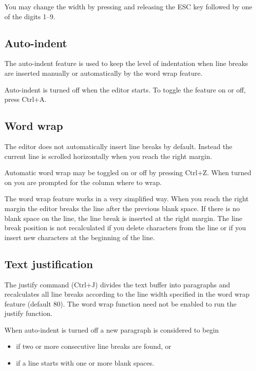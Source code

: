 \documentclass{article}
\begin{document}
        You may change the width by pressing and releasing the ESC key followed
        by one of the digits 1--9.
                
    \subsection{Auto-indent}
        The auto-indent feature is used to keep the level of indentation when line breaks are inserted manually or automatically by
        the word wrap feature.

        Auto-indent is turned off when the editor starts. To toggle the feature on or off, press Ctrl+A.

    \subsection{Word wrap}
        The editor does not automatically insert line breaks by default. Instead the current line is scrolled horizontally
        when you reach the right margin.

        Automatic word wrap may be toggled on or off by pressing Ctrl+Z. When turned on you are prompted for the column
        where to wrap.

        The word wrap feature works in a very simplified way. When you reach the right margin the editor breaks the
        line after the previous blank space. If there is no blank space on the line, the line break is inserted
        at the right margin. The line break position is not recalculated if you delete characters from the line
        or if you insert new characters at the beginning of the line.

    \subsection{Text justification}
        The justify command (Ctrl+J) divides the text buffer into paragraphs and recalculates all line breaks
        according to the line width specified in the word wrap feature (default 80). The word wrap function 
        need not be enabled to run the justify function.
          
        When auto-indent is turned off a new paragraph is considered to begin

        \begin{itemize}
            \item if two or more consecutive line breaks are found, or
            \item if a line starts with one or more blank spaces.
        \end{itemize}
\end{document}
